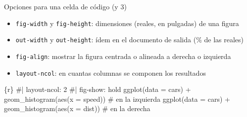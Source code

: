 \documentclass[
  10pt,
  ignorenonframetext,
]{beamer}
\newenvironment{Shaded}{\begin{snugshade}}{\end{snugshade}}
\newcommand{\InformationTok}[1]{\textcolor[rgb]{0.37,0.37,0.37}{#1}}
\begin{document}
\begin{frame}[fragile]{Opciones para una celda de código (y 3)}
\label{opciones-para-una-celda-de-cuxf3digo-y-3}
\begin{itemize}
\item
  \texttt{fig-width} y \texttt{fig-height}: dimensiones (reales, en
  pulgadas) de una figura
\item
  \texttt{out-width} y \texttt{out-height}: ídem en el documento de
  salida (\% de las reales)
\item
  \texttt{fig-align}: mostrar la figura centrada o alineada a derecha o
  izquierda
\item
  \texttt{layout-ncol}: en cuantas columnas se componen los resultados
\end{itemize}

\begin{Shaded}
\begin{Highlighting}[]
\InformationTok{\textasciigrave{}\textasciigrave{}\textasciigrave{}\{r\}}
\InformationTok{\#| layout{-}ncol: 2}
\InformationTok{\#| fig{-}show: hold}
\InformationTok{ggplot(data = cars) + geom\_histogram(aes(x = speed))  \# en la izquierda}
\InformationTok{ggplot(data = cars) + geom\_histogram(aes(x = dist))   \# en la derecha}
\InformationTok{\textasciigrave{}\textasciigrave{}\textasciigrave{}}
\end{Highlighting}
\end{Shaded}

\begin{figure}


\end{figure}
\end{frame}
\end{document}
